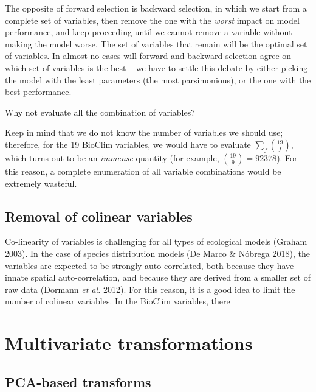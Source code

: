 \documentclass[
  letterpaper,
]{scrbook}
\begin{document}
The opposite of forward selection is backward selection, in which we
start from a complete set of variables, then remove the one with the
\emph{worst} impact on model performance, and keep proceeding until we
cannot remove a variable without making the model worse. The set of
variables that remain will be the optimal set of variables. In almost no
cases will forward and backward selection agree on which set of
variables is the best -- we have to settle this debate by either picking
the model with the least parameters (the most parsimonious), or the one
with the best performance.

Why not evaluate all the combination of variables?

Keep in mind that we do not know the number of variables we should use;
therefore, for the 19 BioClim variables, we would have to evaluate
\(\sum_f \binom{19}{f}\), which turns out to be an \emph{immense}
quantity (for example, \(\binom{19}{9}=92378\)). For this reason, a
complete enumeration of all variable combinations would be extremely
wasteful.

\subsection{Removal of colinear
variables}\label{removal-of-colinear-variables}

Co-linearity of variables is challenging for all types of ecological
models (Graham 2003). In the case of species distribution models (De
Marco \& Nóbrega 2018), the variables are expected to be strongly
auto-correlated, both because they have innate spatial auto-correlation,
and because they are derived from a smaller set of raw data (Dormann
\emph{et al.} 2012). For this reason, it is a good idea to limit the
number of colinear variables. In the BioClim variables, there

\section{Multivariate
transformations}\label{multivariate-transformations}

\subsection{PCA-based transforms}\label{pca-based-transforms}
\end{document}
